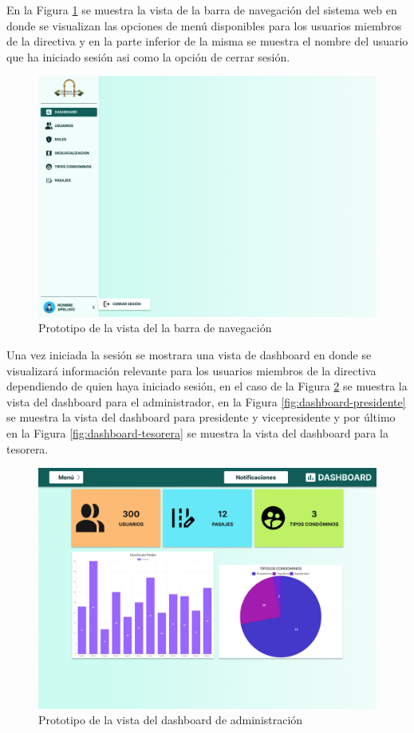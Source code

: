 En la Figura \ref{fig:nevagacion} se muestra la vista de la barra de navegación del sistema web en donde se visualizan las opciones de menú disponibles para los usuarios miembros de la directiva y en la parte inferior de la misma se muestra el nombre del usuario que ha iniciado sesión asi como la opción de cerrar sesión.

\begin{figure}[H]
    \centering
    \includegraphics[width=1\textwidth]{resources/images/navegacion}
    \caption{Prototipo de la vista del la barra de navegación}
    \label{fig:nevagacion}
\end{figure}


Una vez iniciada la sesión se mostrara una vista de dashboard en donde se visualizará información relevante para los usuarios miembros de la directiva dependiendo de quien haya iniciado sesión, en el caso de la Figura \ref{fig:dashboard} se muestra la vista del dashboard para el administrador, en la Figura \ref{fig:dashboard-presidente} se muestra la vista del dashboard para presidente y vicepresidente y por último en la Figura \ref{fig:dashboard-tesorera} se muestra la vista del dashboard para la tesorera.

\begin{figure}[H]
    \centering
    \includegraphics[width=1\textwidth]{resources/images/dashboard}
    \caption{Prototipo de la vista del dashboard de administración}
    \label{fig:dashboard}
\end{figure}

